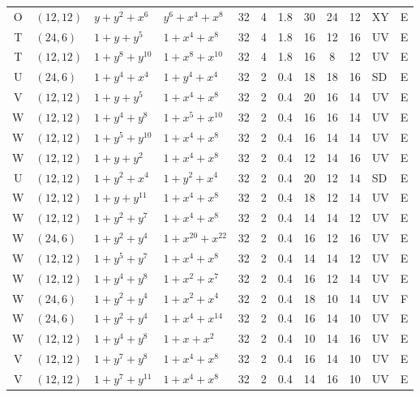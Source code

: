 \begin{table}[t]
\begin{tabular*}{\textwidth}{@{\extracolsep{\fill}}clllcccccclc}
O & $(12,12)$ & $y{+}y^{2}{+}x^{6}$ & $y^{6}{+}x^{4}{+}x^{8}$ & 32 & 4 & 1.8 & 30 & 24 & 12 & XY & E \\
T & $(24,6)$ & $1{+}y{+}y^{5}$ & $1{+}x^{4}{+}x^{8}$ & 32 & 4 & 1.8 & 16 & 12 & 16 & UV & E \\
T & $(12,12)$ & $1{+}y^{8}{+}y^{10}$ & $1{+}x^{8}{+}x^{10}$ & 32 & 4 & 1.8 & 16 & 8 & 12 & UV & E \\
U & $(24,6)$ & $1{+}y^{4}{+}x^{4}$ & $1{+}y^{4}{+}x^{4}$ & 32 & 2 & 0.4 & 18 & 18 & 16 & SD & E \\
V & $(12,12)$ & $1{+}y{+}y^{5}$ & $1{+}x^{4}{+}x^{8}$ & 32 & 2 & 0.4 & 20 & 16 & 14 & UV & E \\
W & $(12,12)$ & $1{+}y^{4}{+}y^{8}$ & $1{+}x^{5}{+}x^{10}$ & 32 & 2 & 0.4 & 16 & 16 & 14 & UV & E \\
W & $(12,12)$ & $1{+}y^{5}{+}y^{10}$ & $1{+}x^{4}{+}x^{8}$ & 32 & 2 & 0.4 & 16 & 14 & 14 & UV & E \\
W & $(12,12)$ & $1{+}y{+}y^{2}$ & $1{+}x^{4}{+}x^{8}$ & 32 & 2 & 0.4 & 12 & 14 & 16 & UV & E \\
U & $(12,12)$ & $1{+}y^{2}{+}x^{4}$ & $1{+}y^{2}{+}x^{4}$ & 32 & 2 & 0.4 & 20 & 12 & 14 & SD & E \\
W & $(12,12)$ & $1{+}y{+}y^{11}$ & $1{+}x^{4}{+}x^{8}$ & 32 & 2 & 0.4 & 18 & 12 & 14 & UV & E \\
W & $(12,12)$ & $1{+}y^{2}{+}y^{7}$ & $1{+}x^{4}{+}x^{8}$ & 32 & 2 & 0.4 & 14 & 14 & 12 & UV & E \\
W & $(24,6)$ & $1{+}y^{2}{+}y^{4}$ & $1{+}x^{20}{+}x^{22}$ & 32 & 2 & 0.4 & 16 & 12 & 16 & UV & E \\
W & $(12,12)$ & $1{+}y^{5}{+}y^{7}$ & $1{+}x^{4}{+}x^{8}$ & 32 & 2 & 0.4 & 14 & 14 & 12 & UV & E \\
W & $(12,12)$ & $1{+}y^{4}{+}y^{8}$ & $1{+}x^{2}{+}x^{7}$ & 32 & 2 & 0.4 & 16 & 12 & 14 & UV & E \\
W & $(24,6)$ & $1{+}y^{2}{+}y^{4}$ & $1{+}x^{2}{+}x^{4}$ & 32 & 2 & 0.4 & 18 & 10 & 14 & UV & F \\
W & $(24,6)$ & $1{+}y^{2}{+}y^{4}$ & $1{+}x^{4}{+}x^{14}$ & 32 & 2 & 0.4 & 16 & 14 & 10 & UV & E \\
W & $(12,12)$ & $1{+}y^{4}{+}y^{8}$ & $1{+}x{+}x^{2}$ & 32 & 2 & 0.4 & 10 & 14 & 16 & UV & E \\
V & $(12,12)$ & $1{+}y^{7}{+}y^{8}$ & $1{+}x^{4}{+}x^{8}$ & 32 & 2 & 0.4 & 16 & 14 & 10 & UV & E \\
V & $(12,12)$ & $1{+}y^{7}{+}y^{11}$ & $1{+}x^{4}{+}x^{8}$ & 32 & 2 & 0.4 & 14 & 16 & 10 & UV & E \\

\end{tabular*}
\end{table}
